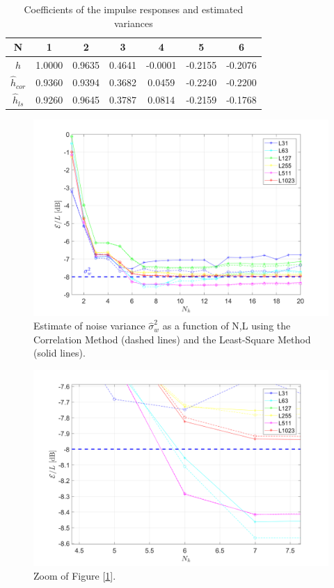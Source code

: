 \documentclass[a4paper, 12pt]{report}
\begin{document}
\begin{table}[H]
	\centering
	\begin{tabular}{c|c|c|c|c|c|c}
		\toprule
		\textbf{N} & 1 & 2 & 3 & 4 & 5 & 6 \\
		\midrule
		\textbf{$h$} & 1.0000  &  0.9635 &   0.4641 &  -0.0001  & -0.2155 &  -0.2076\\
		\midrule
		\textbf{$\hat{h}_{cor}$} & 0.9360 &   0.9394  &  0.3682 &   0.0459 &  -0.2240 &  -0.2200\\
		\midrule
		\textbf{$\hat{h}_{ls}$} & 0.9260 &   0.9645  &  0.3787  &  0.0814  & -0.2159   &-0.1768\\
		\bottomrule			
	\end{tabular}
	\caption{Coefficients of the impulse responses and estimated variances}
	\label{}
\end{table}

\begin{figure}[H]
	\centering
	\includegraphics[width=16cm]{images/Ex1_plot1}
	\caption{Estimate of noise variance $\hat{\sigma}_w^2$ as a function of N,L using the Correlation Method (dashed lines) and the Least-Square Method (solid lines).}\label{Ex1_plot1}
\end{figure}

\begin{figure}[H]
	\centering
	\includegraphics[width=16cm]{images/Ex1_plot2}
	\caption{Zoom of Figure [\ref{Ex1_plot1}].}\label{Ex1_plot2}
\end{figure}
\end{document}
